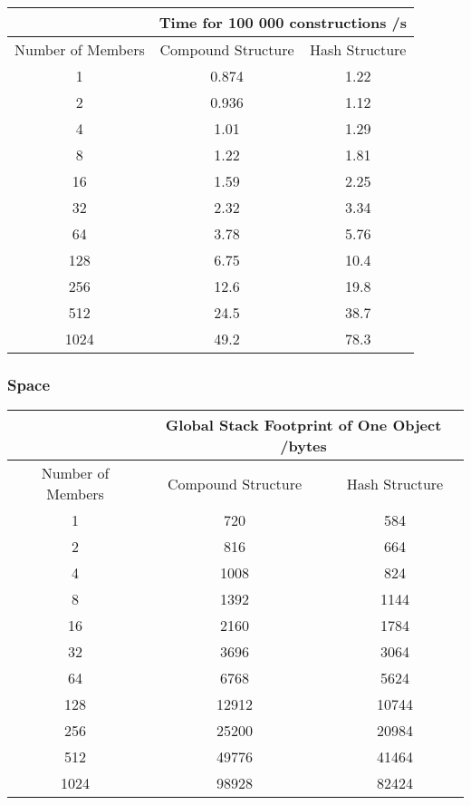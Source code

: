 \documentclass[12pt,a4paper,twoside,openright]{report}
\begin{document}
\begin{center}
\begin{tabular}{c|c|c}

& \multicolumn{2}{c}{Time for 100 000 constructions /s} \\
\hline
Number of Members &Compound Structure & Hash Structure \\
\hline
1	&	0.874		&	1.22	\\
2	&	0.936		&	1.12	\\
4	&	1.01		&	1.29	\\
8	&	1.22		&	1.81	\\
16	&	1.59		&	2.25	\\
32	&	2.32		&	3.34	\\
64	&	3.78		&	5.76	\\
128	&	6.75		&	10.4	\\
256	&	12.6		&	19.8	\\
512	&	24.5		&	38.7	\\
1024	&	49.2		&	78.3	\\

\end{tabular}
\end{center}

\subsubsection{Space}

\begin{center}
\begin{tabular}{c|c|c}

& \multicolumn{2}{c}{Global Stack Footprint of One Object /bytes} \\
\hline
Number of Members &Compound Structure & Hash Structure \\
\hline
1	&	720		&	584	\\
2	&	816		&	664	\\
4	&	1008		&	824	\\
8	&	1392		&	1144	\\
16	&	2160		&	1784	\\
32	&	3696		&	3064	\\
64	&	6768		&	5624	\\
128	&	12912		&	10744	\\
256	&	25200		&	20984	\\
512	&	49776		&	41464	\\
1024	&	98928		&	82424	\\

\end{tabular}
\end{center}
\end{document}
